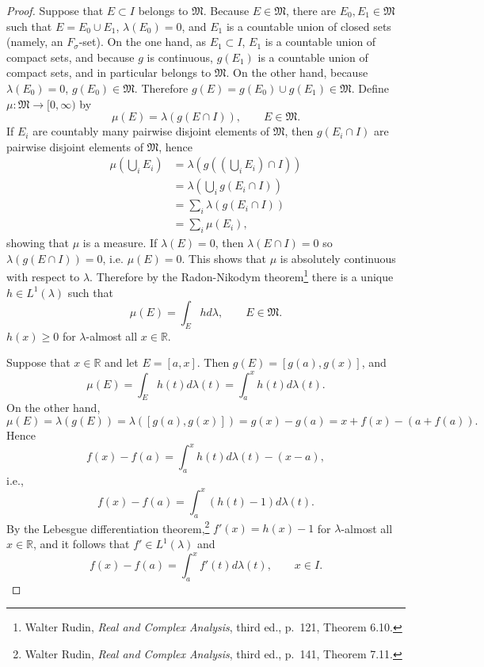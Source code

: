 \documentclass{article}
\theoremstyle{definition}
\theoremstyle{definition}
\begin{document}
\begin{proof}
Suppose that $E \subset I$ belongs to $\mathfrak{M}$. Because
$E \in \mathfrak{M}$, there are  $E_0,E_1 \in \mathfrak{M}$ such that
$E=E_0 \cup E_1$, $\lambda(E_0)=0$, and $E_1$ is a countable union of closed sets (namely, an $F_\sigma$-set).
On the one hand, as $E_1 \subset I$, $E_1$ is a countable union of compact sets, and because
$g$ is continuous, $g(E_1)$ is a countable union of compact sets, and in particular
belongs to $\mathfrak{M}$.
On the other hand, because $\lambda(E_0)=0$, $g(E_0) \in \mathfrak{M}$. Therefore
$g(E) = g(E_0) \cup g(E_1) \in \mathfrak{M}$.
Define
$\mu:\mathfrak{M} \to [0,\infty)$ by
\[
\mu(E) = \lambda(g(E \cap I)), \qquad E \in \mathfrak{M}.
\]
If $E_i$ are countably many pairwise disjoint elements of $\mathfrak{M}$, then
$g(E_i \cap I)$ are pairwise disjoint elements of $\mathfrak{M}$, hence
\begin{align*}
\mu\left(\bigcup_i E_i \right)& = \lambda\left( g\left( \left(\bigcup_i E_i\right) \cap I \right)\right)\\
&= \lambda\left(  \bigcup_i g(E_i \cap I) \right)\\
&= \sum_i \lambda(g(E_i \cap I))\\
&=\sum_i \mu(E_i),
\end{align*}
showing that $\mu$ is a measure. If $\lambda(E)=0$, then 
$\lambda(E \cap I)=0$ so $\lambda(g(E \cap I))=0$, i.e. 
$\mu(E)=0$. This shows that $\mu$ is absolutely continuous with respect to $\lambda$. 
Therefore by the Radon-Nikodym theorem\footnote{Walter Rudin,
{\em Real and Complex Analysis}, third ed., p.~121, Theorem 6.10.} there is a unique
$h \in L^1(\lambda)$ such that
\[
\mu(E) = \int_E h d\lambda, \qquad E \in \mathfrak{M}.
\]
$h(x) \geq 0$ for $\lambda$-almost all $x \in \mathbb{R}$. 

Suppose that $x \in \mathbb{R}$ and let $E=[a,x]$. Then
$g(E)=[g(a),g(x)]$, and 
\[
\mu(E) = \int_E h(t) d\lambda(t) = \int_a^x h(t) d\lambda(t).
\]
On the other hand,
\[
\mu(E) = \lambda(g(E)) = \lambda([g(a),g(x)]) = g(x)-g(a) = x+f(x)-(a+f(a)).
\]
Hence
\[
f(x)-f(a) = \int_a^x h(t) d\lambda(t)-(x-a),
\]
i.e.,
\[
f(x)-f(a) = \int_a^x (h(t)-1) d\lambda(t).
\]
By the Lebesgue differentiation theorem,\footnote{Walter Rudin, {\em Real and Complex Analysis},
third ed., p.~141, Theorem 7.11.} 
$f'(x) = h(x)-1$ for $\lambda$-almost all $x \in \mathbb{R}$, and it follows that $f' \in L^1(\lambda)$ and
\[
f(x)-f(a) = \int_a^x f'(t) d\lambda(t), \qquad  x \in I.
\]


\end{proof}
\end{document}
